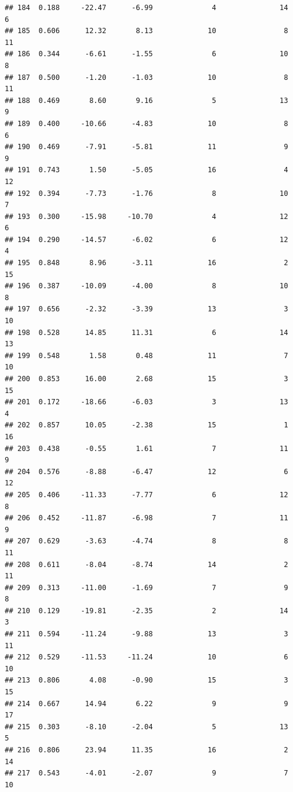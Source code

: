 \documentclass[]{book}
\begin{document}
\begin{verbatim}
## 184  0.188     -22.47      -6.99              4               14        6
## 185  0.606      12.32       8.13             10                8       11
## 186  0.344      -6.61      -1.55              6               10        8
## 187  0.500      -1.20      -1.03             10                8       11
## 188  0.469       8.60       9.16              5               13        9
## 189  0.400     -10.66      -4.83             10                8        6
## 190  0.469      -7.91      -5.81             11                9        9
## 191  0.743       1.50      -5.05             16                4       12
## 192  0.394      -7.73      -1.76              8               10        7
## 193  0.300     -15.98     -10.70              4               12        6
## 194  0.290     -14.57      -6.02              6               12        4
## 195  0.848       8.96      -3.11             16                2       15
## 196  0.387     -10.09      -4.00              8               10        8
## 197  0.656      -2.32      -3.39             13                3       10
## 198  0.528      14.85      11.31              6               14       13
## 199  0.548       1.58       0.48             11                7       10
## 200  0.853      16.00       2.68             15                3       15
## 201  0.172     -18.66      -6.03              3               13        4
## 202  0.857      10.05      -2.38             15                1       16
## 203  0.438      -0.55       1.61              7               11        9
## 204  0.576      -8.88      -6.47             12                6       12
## 205  0.406     -11.33      -7.77              6               12        8
## 206  0.452     -11.87      -6.98              7               11        9
## 207  0.629      -3.63      -4.74              8                8       11
## 208  0.611      -8.04      -8.74             14                2       11
## 209  0.313     -11.00      -1.69              7                9        8
## 210  0.129     -19.81      -2.35              2               14        3
## 211  0.594     -11.24      -9.88             13                3       11
## 212  0.529     -11.53     -11.24             10                6       10
## 213  0.806       4.08      -0.90             15                3       15
## 214  0.667      14.94       6.22              9                9       17
## 215  0.303      -8.10      -2.04              5               13        5
## 216  0.806      23.94      11.35             16                2       14
## 217  0.543      -4.01      -2.07              9                7       10

\end{verbatim}
\end{document}
